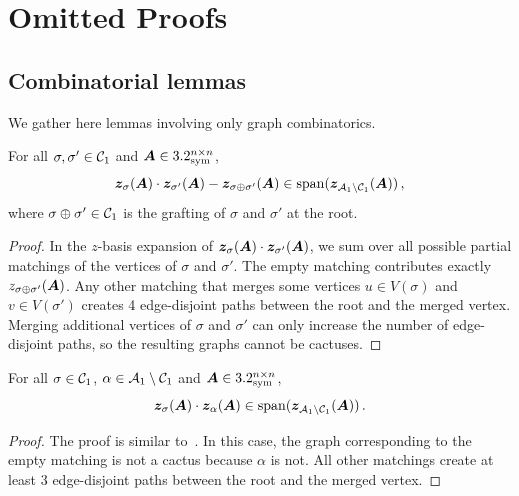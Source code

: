 \section{Omitted Proofs}
\label{sec:omitted}

\subsection{Combinatorial lemmas}
\label{sec:combinatorics}

We gather here lemmas involving only
graph combinatorics.


\begin{lemma}
    \label{lem:prod-cactus-cactus}
    For all $\sigma,\sigma'\in {\cal C}_1$ and ${\bm A}\in3.2_{\mathrm{sym}}^{n\times n}$,
    \[
        {\bm z}_{\sigma}({\bm A}) \cdot {\bm z}_{\sigma'}({\bm A}) - {\bm z}_{\sigma\oplus \sigma'}({\bm A})\in \operatorname{span}({\bm z}_{{\cal A}_1\setminus {\cal C}_1}({\bm A}))\,,
    \]
    where $\sigma\oplus \sigma'\in{\cal C}_1$ is the grafting
    of $\sigma$ and $\sigma'$ at the root.
\end{lemma}

\begin{proof}
    In the $z$-basis expansion of
    ${\bm z}_\sigma({\bm A})\cdot {\bm z}_{\sigma'}({\bm A})$, we sum over all possible partial
    matchings of the vertices of $\sigma$
    and $\sigma'$. The empty matching 
    contributes exactly $z_{\sigma\oplus \sigma'}({\bm A})$.
    Any other matching that merges some
    vertices $u\in V(\sigma)$ and $v\in V(\sigma')$ creates 4 edge-disjoint paths
    between the root and the merged vertex.
    Merging additional vertices of $\sigma$ and
    $\sigma'$ can only increase the
    number of edge-disjoint paths, so the
    resulting graphs cannot be cactuses.
\end{proof}

\begin{lemma}
    \label{lem:prod-cactus-other}
    For all $\sigma\in{\cal C}_1$, $\alpha\in {\cal A}_1\setminus {\cal C}_1$ and ${\bm A}\in3.2_{\mathrm{sym}}^{n\times n}$,
    \[
        {\bm z}_{\sigma}({\bm A}) \cdot {\bm z}_{\alpha}({\bm A}) \in \operatorname{span}({\bm z}_{{\cal A}_1\setminus {\cal C}_1}({\bm A}))\,.
    \]
\end{lemma}

\begin{proof}
    The proof is similar to~.
    In this case, the graph corresponding
    to the empty matching is not a cactus
    because $\alpha$ is not.
    All other matchings create at least
    3 edge-disjoint paths between the root
    and the merged vertex.
\end{proof}

